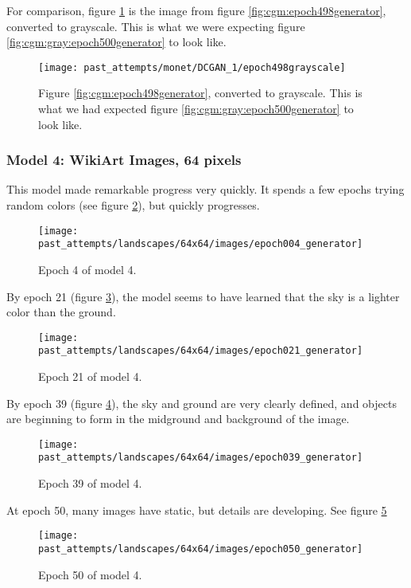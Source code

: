 \documentclass[11pt,letterpaper]{article}
\begin{document}
				For comparison, figure \ref{fig:cgm:epoch498grayscale} is the image from figure \ref{fig:cgm:epoch498generator}, converted to grayscale.
				This is what we were expecting figure \ref{fig:cgm:gray:epoch500generator} to look like.
				\begin{figure}
					\centering
					\texttt{[image: past\_attempts/monet/DCGAN\_1/epoch498grayscale]}
					\caption{Figure \ref{fig:cgm:epoch498generator}, converted to grayscale. This is what we had expected figure \ref{fig:cgm:gray:epoch500generator} to look like.}
					\label{fig:cgm:epoch498grayscale}
				\end{figure}

			\subsubsection{Model 4: WikiArt Images, 64 pixels}
				This model made remarkable progress very quickly.
				It spends a few epochs trying random colors (see figure \ref{fig:wa64:epoch004generator}), but quickly progresses.
				\begin{figure}
					\centering
					\texttt{[image: past\_attempts/landscapes/64x64/images/epoch004\_generator]}
					\caption{Epoch 4 of model 4.}
					\label{fig:wa64:epoch004generator}
				\end{figure}

				By epoch 21 (figure \ref{fig:wa64:epoch021generator}), the model seems to have learned that the sky is a lighter color than the ground.
				\begin{figure}
					\centering
					\texttt{[image: past\_attempts/landscapes/64x64/images/epoch021\_generator]}
					\caption{Epoch 21 of model 4.}
					\label{fig:wa64:epoch021generator}
				\end{figure}

				By epoch 39 (figure \ref{fig:wa64:epoch039generator}), the sky and ground are very clearly defined, and objects are beginning to form in the midground and background of the image.
				\begin{figure}
					\centering
					\texttt{[image: past\_attempts/landscapes/64x64/images/epoch039\_generator]}
					\caption{Epoch 39 of model 4.}
					\label{fig:wa64:epoch039generator}
				\end{figure}

				At epoch 50, many images have static, but details are developing.
				See figure \ref{fig:wa64:epoch050generator}
				\begin{figure}
					\centering
					\texttt{[image: past\_attempts/landscapes/64x64/images/epoch050\_generator]}
					\caption{Epoch 50 of model 4.}
					\label{fig:wa64:epoch050generator}
				\end{figure}
\end{document}

